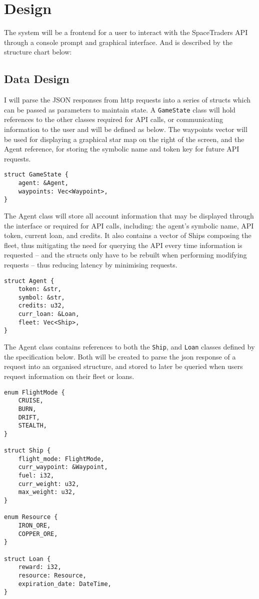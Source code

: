 \section{Design}
The system will be a frontend for a user to interact with the SpaceTraders API through a console prompt and graphical interface. And is described by the structure chart below:



\subsection{Data Design}
I will parse the JSON responses from http requests into a series of structs which can be passed as parameters to maintain state. A \texttt{GameState} class will hold references to the other classes required for API calls, or communicating information to the user and will be defined as below. The waypoints vector will be used for displaying a graphical star map on the right of the screen, and the Agent reference, for storing the symbolic name and token key for future API requests.
\begin{lstlisting}
struct GameState {
    agent: &Agent,
    waypoints: Vec<Waypoint>,
}
\end{lstlisting}

The Agent class will store all account information that may be displayed through the interface or required for API calls, including: the agent's symbolic name, API token, current loan, and credits. It also contains a vector of Ships composing the fleet, thus mitigating the need for querying the API every time information is requested – and the structs only have to be rebuilt when performing modifying requests – thus reducing latency by minimising requests.
\begin{lstlisting}
struct Agent {
    token: &str, 
    symbol: &str,
    credits: u32,
    curr_loan: &Loan,
    fleet: Vec<Ship>,
} 
\end{lstlisting}

The Agent class contains references to both the \texttt{Ship}, and \texttt{Loan} classes defined by the specification below. Both will be created to parse the json response of a request into an organised structure, and stored to later be queried when users request information on their fleet or loans.
\begin{lstlisting}
enum FlightMode {
    CRUISE,
    BURN,
    DRIFT,
    STEALTH,
}

struct Ship {
    flight_mode: FlightMode,
    curr_waypoint: &Waypoint,
    fuel: i32,
    curr_weight: u32,
    max_weight: u32,
}

enum Resource {
    IRON_ORE,
    COPPER_ORE,
}

struct Loan { 
    reward: i32,
    resource: Resource,
    expiration_date: DateTime,
}
\end{lstlisting}

